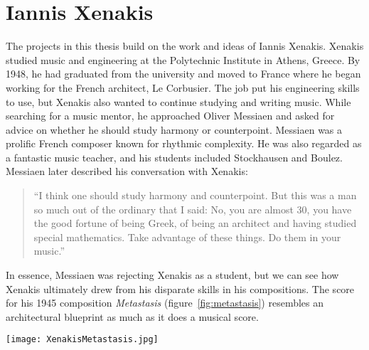 
\section{Iannis Xenakis}
\label{sec:iannis-xenakis}
The projects in this thesis build on the work and ideas of Iannis
Xenakis. Xenakis studied music and engineering at the Polytechnic
Institute in Athens, Greece. By 1948, he had graduated from the
university and moved to France where he began working for the French
architect, Le Corbusier. The job put his engineering skills to use,
but Xenakis also wanted to continue studying and writing music. While
searching for a music mentor, he approached Oliver Messiaen and asked
for advice on whether he should study harmony or
counterpoint. Messiaen was a prolific French composer known for
rhythmic complexity. He was also regarded as a fantastic music
teacher, and his students included Stockhausen and Boulez. Messiaen
later described his conversation with Xenakis:
\begin{quotation}``I think one should study harmony and
  counterpoint. But this was a man so much out of the ordinary that I
  said: No, you are almost 30, you have the good fortune of being
  Greek, of being an architect and having studied special
  mathematics. Take advantage of these things. Do them in your
  music.''\cite{Service2013}
\end{quotation}
In essence, Messiaen was rejecting Xenakis as a student, but we can
see how Xenakis ultimately drew from his disparate skills in his
compositions. The score for his 1945 composition \textit{Metastasis}
(figure~\ref{fig:metastasis}) resembles an architectural blueprint as
much as it does a musical score.

\begin{figure*}[h]
  \texttt{[image: XenakisMetastasis.jpg]}
  \caption{Excerpt from Iannis Xenakis' composition,
    \textit{Metastasis} (1954), measures 309-314. This score in this
    image was then transcribed to sheet music for the orchestral
    performance.}
  \label{fig:metastasis}
\end{figure*}


